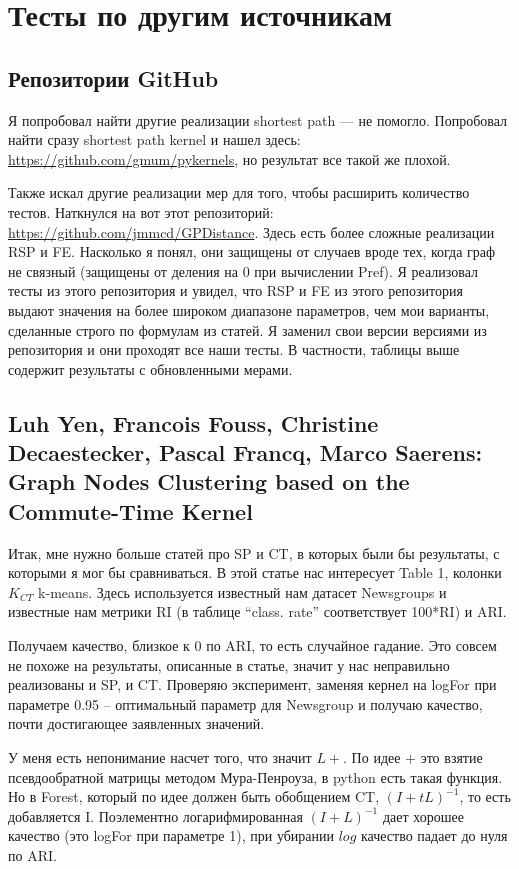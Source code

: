 \documentclass{article}
\begin{document}
\section{Тесты по другим источникам}

\subsection{Репозитории GitHub}
Я попробовал найти другие реализации shortest path --- не помогло. Попробовал найти сразу shortest path kernel и нашел здесь: \url{https://github.com/gmum/pykernels}, но результат все такой же плохой.

Также искал другие реализации мер для того, чтобы расширить количество тестов. Наткнулся на вот этот репозиторий: \url{https://github.com/jmmcd/GPDistance}. Здесь есть более сложные реализации RSP и FE. Насколько я понял, они защищены от случаев вроде тех, когда граф не связный (защищены от деления на 0 при вычислении Pref). Я реализовал тесты из этого репозитория и увидел, что RSP и FE из этого репозитория выдают значения на более широком диапазоне параметров, чем мои варианты, сделанные строго по формулам из статей. Я заменил свои версии версиями из репозитория и они проходят все наши тесты. В частности, таблицы выше содержит результаты с обновленными мерами.

\subsection{Luh Yen, Francois Fouss, Christine Decaestecker, Pascal Francq, Marco Saerens: \\
            Graph Nodes Clustering based on the Commute-Time Kernel}
Итак, мне нужно больше статей про SP и CT, в которых были бы результаты, с которыми я мог бы сравниваться. В этой статье нас интересует Table 1, колонки $K_{CT}$ k-means. Здесь используется известный нам датасет Newsgroups и известные нам метрики RI (в таблице ``class. rate'' соответствует 100*RI) и ARI.

Получаем качество, близкое к 0 по ARI, то есть случайное гадание. Это совсем не похоже на результаты, описанные в статье, значит у нас неправильно реализованы и SP, и CT.
Проверяю эксперимент, заменяя кернел на logFor при параметре 0.95 -- оптимальный параметр для Newsgroup и получаю качество, почти достигающее заявленных значений.

У меня есть непонимание насчет того, что значит $L+$. По идее $+$ это взятие псевдообратной матрицы методом Мура-Пенроуза, в python есть такая функция. Но в Forest, который по идее должен быть обобщением CT, $(I + tL)^{-1}$, то есть добавляется I. Поэлементно логарифмированная $(I + L)^{-1}$ дает хорошее качество (это logFor при параметре 1), при убирании $log$ качество падает до нуля по ARI.
\end{document}
